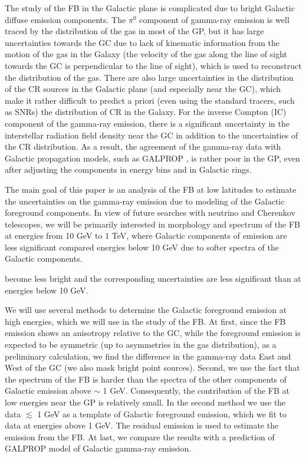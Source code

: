 The study of the FB in the Galactic plane is complicated due to bright Galactic diffuse emission components.
The $\pi^0$ component of gamma-ray emission is well traced by the distribution of the gas in most of the GP,
but it has large uncertainties towards the GC due to lack of kinematic information from the motion of the gas in the 
Galaxy (the velocity of the gas along the line of sight towards the GC is perpendicular to the line of sight),
which is used to reconstruct the distribution of the gas.
There are also large uncertainties in the distribution of the CR sources in the Galactic plane (and especially near the GC),
which make it rather difficult to predict a priori (even using the standard tracers, such as SNRs) the distribution
of CR in the Galaxy.
For the inverse Compton (IC) component of the gamma-ray emission, 
there is a significant uncertainty in the interstellar radiation field density near the GC \citep[e.g.,][]{2017ApJ...846...67P} in addition to 
the uncertainties of the CR distribution.
As a result, the agreement of the gamma-ray data with Galactic propagation models, such as GALPROP \citep{2007ARNPS..57..285S}, 
is rather poor in the GP, even after adjusting the components in energy bins and in Galactic rings.

The main goal of this paper is an analysis of the FB at low latitudes to estimate the uncertainties on the gamma-ray 
emission due to modeling of the Galactic foreground components.
In view of future searches with neutrino and Cherenkov telescopes, 
we will be primarily interested in morphology and spectrum of the FB at energies from 10 GeV to 1 TeV,
where Galactic components of emission are less significant compared energies below 10 GeV due to softer 
spectra of the Galactic components.

become less bright
and the corresponding uncertainties are less significant than at energies below 10 GeV.

We will use several methods to determine the Galactic foreground emission at high energies,
which we will use in the study of the FB.
At first, since the FB emission shows an anisotropy relative to the GC, 
while the foreground emission is expected to be symmetric (up to asymmetries in the gas distribution),
as a preliminary calculation, we find the difference in the gamma-ray data East and West of the GC 
(we also mask bright point sources).
Second, we use the fact that the spectrum of the FB is harder than the spectra of the other components of Galactic emission
above $\sim$ 1 GeV.
Consequently, the contribution of the FB at low energies near the GP is relatively small. 
In the second method we use the data $\lesssim$ 1 GeV as a template of Galactic foreground emission, 
which we fit to data at energies above 1 GeV.
The residual emission is used to estimate the emission from the FB.
At last, we compare the results with a prediction of GALPROP model of Galactic gamma-ray emission.





